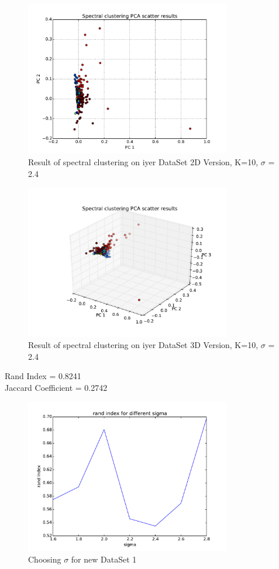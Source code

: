 \documentclass[paper=letter, fontsize=11pt]{article}
\numberwithin{equation}{section}		%
\numberwithin{figure}{section}			%
\numberwithin{table}{section}				%
\begin{document}
\begin{figure}[H]
	\centering
	\includegraphics[width=0.8\textwidth]{S_iyer_2D.pdf}
	\caption{Result of spectral clustering on iyer DataSet  2D Version, K=10, $\sigma$ = 2.4}
\end{figure}

\begin{figure}[H]
	\centering
	\includegraphics[width=0.8\textwidth]{S_iyer_3D.pdf}
	\caption{Result of spectral clustering on iyer DataSet 3D Version, K=10, $\sigma$ = 2.4}
\end{figure}
\noindent Rand Index = 0.8241\\
Jaccard Coefficient = 0.2742\\


\begin{figure}[H]
	\centering
	\includegraphics[width=0.8\textwidth]{choose_sigma_new_dataset1.pdf}
	\caption{Choosing $\sigma$ for new DataSet 1 }
\end{figure}
\end{document}
